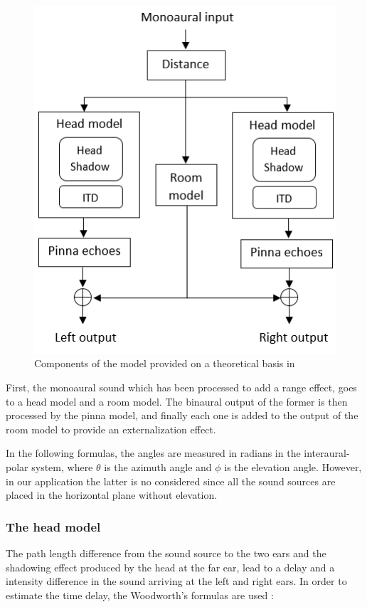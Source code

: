 \documentclass[journal]{IEEEtran}
\begin{document}
\begin{figure}
	\centering
		\includegraphics[scale=0.75]{graphics/graphic.png}
	\caption{Components of the model provided on a theoretical basis in \cite{Brown1997}}
	\label{fig:workflow}
\end{figure}


First, the monoaural sound which has been processed to add a range effect, goes to a head model and a room model. The binaural output of the former is then processed by the pinna model, and finally each one is added to the output of the room model to provide an externalization effect.

In the following formulas, the angles are measured in radians in the interaural-polar system, where $\theta$ is the azimuth angle and $\phi$ is the elevation angle. However, in our application the latter is no considered since all the sound sources are placed in the horizontal plane without elevation.


\subsubsection{The head model}

The path length difference from the sound source to the two ears and the shadowing effect produced by the head at the far ear, lead to a delay and a intensity difference in the sound arriving at the left and right ears. In order to estimate the time delay, the Woodworth's formulas are used \cite{Woodworth} :
\end{document}
